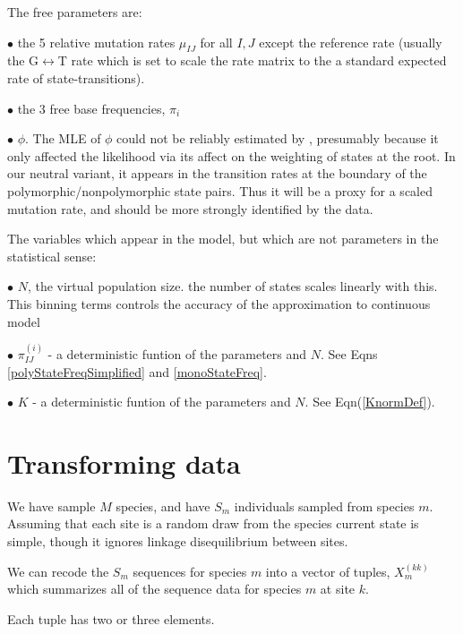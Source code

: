 \documentclass{llncs}
\newcommand{\virtPopSize}{\ensuremath{N}}
\newcommand{\polyProb}{\ensuremath{\phi}}}
\newcommand{\Knorm}{\ensuremath{K}}}
\begin{document}
The free parameters are:
\begin{compactitem}
    \item[$\bullet$] the 5 relative mutation rates $\mu_{IJ}$ for all $I,J$ except the reference rate (usually the G$\leftrightarrow$T rate which is set to scale the rate matrix to the a standard expected rate of state-transitions).
    \item[$\bullet$] the 3 free base frequencies, $\pi_i$
    \item[$\bullet$] $\polyProb$. The MLE of $\polyProb$ could not be reliably estimated by \cite{DeMaioSK2013}, presumably because it only
    affected the likelihood via its affect on the weighting of states at the root.
    In our neutral variant, it appears in the transition rates at the boundary of the polymorphic/nonpolymorphic state pairs.
    Thus it will be a proxy for a scaled mutation rate, and should be more strongly identified by the data.
\end{compactitem}

The variables which appear in the model, but which are not parameters in the statistical sense:
\begin{compactitem}
    \item[$\bullet$] $\virtPopSize$, the virtual population size. the number of states scales linearly with this.
    This binning terms controls the accuracy of the approximation to continuous model 
    \item[$\bullet$] $\pi_{IJ}^{(i)}$ - a deterministic funtion of the parameters and \virtPopSize. See Eqns \ref{polyStateFreqSimplified} and \ref{monoStateFreq}.
    \item[$\bullet$] $\Knorm$ - a deterministic funtion of the parameters and \virtPopSize. See Eqn(\ref{KnormDef}).
\end{compactitem}

\section{Transforming data}
We have sample $M$ species, and have $S_m$ individuals sampled from species $m$.
Assuming that each site is a random draw from the species current state is simple, though it ignores
    linkage disequilibrium between sites.

We can recode the $S_m$ sequences for species $m$ into a vector of tuples, $X_m^{(kk)}$ which 
    summarizes all of the sequence data for species $m$ at site $k$.

Each tuple has two or three elements.
\end{document}
